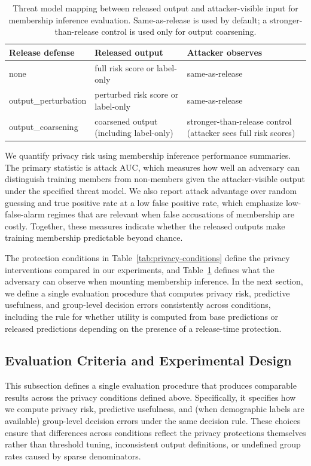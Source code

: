 \documentclass{edm_article}
\begin{document}
\begin{table}[t]
\centering
\caption{Threat model mapping between released output and attacker-visible input for membership inference evaluation. Same-as-release is used by default; a stronger-than-release control is used only for output coarsening.}
\label{tab:threat-model}
\setlength{\tabcolsep}{6pt}
\begin{tabular}{@{}lll@{}}
\toprule
Release defense & Released output & Attacker observes \\
\midrule
none & full risk score or label-only & same-as-release \\
output\_perturbation & perturbed risk score or label-only & same-as-release \\
output\_coarsening & coarsened output (including label-only) & stronger-than-release control (attacker sees full risk scores) \\
\bottomrule
\end{tabular}
\end{table}


We quantify privacy risk using membership inference performance summaries. The primary statistic is attack AUC, which measures how well an adversary can distinguish training members from non-members given the attacker-visible output under the specified threat model. We also report attack advantage over random guessing and true positive rate at a low false positive rate, which emphasize low-false-alarm regimes that are relevant when false accusations of membership are costly. Together, these measures indicate whether the released outputs make training membership predictable beyond chance.

The protection conditions in Table~\ref{tab:privacy-conditions} define the privacy interventions compared in our experiments, and Table~\ref{tab:threat-model} defines what the adversary can observe when mounting membership inference. In the next section, we define a single evaluation procedure that computes privacy risk, predictive usefulness, and group-level decision errors consistently across conditions, including the rule for whether utility is computed from base predictions or released predictions depending on the presence of a release-time protection.

\subsection{Evaluation Criteria and Experimental Design}

This subsection defines a single evaluation procedure that produces comparable results across the privacy conditions defined above. Specifically, it specifies how we compute privacy risk, predictive usefulness, and (when demographic labels are available) group-level decision errors under the same decision rule. These choices ensure that differences across conditions reflect the privacy protections themselves rather than threshold tuning, inconsistent output definitions, or undefined group rates caused by sparse denominators.
\end{document}

